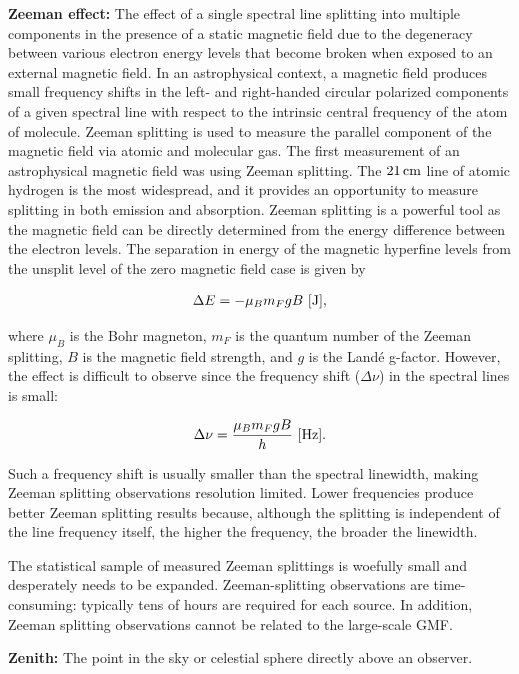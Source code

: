 \documentclass[a4paper,10pt]{article}
\begin{document}
{\noindent}\textbf{Zeeman effect:} The effect of a single spectral line splitting into multiple components in the presence of a static magnetic field due to the degeneracy between various electron energy levels that become broken when exposed to an external magnetic field. In an astrophysical context, a magnetic field produces small frequency shifts in the left- and right-handed circular polarized components of a given spectral line with respect to the intrinsic central frequency of the atom of molecule. Zeeman splitting is used to measure the parallel component of the magnetic field via atomic and molecular gas. The first measurement of an astrophysical magnetic field was using Zeeman splitting. The $21\,{\rm cm}$ line of atomic hydrogen is the most widespread, and it provides an opportunity to measure splitting in both emission and absorption. Zeeman splitting is a powerful tool as the magnetic field can be directly determined from the energy difference between the electron levels. The separation in energy of the magnetic hyperfine levels from the unsplit level of the zero magnetic field case is given by

\begin{align*}
    \Delta E = -\mu_Bm_FgB ~ [{\rm J}],
\end{align*}

{\noindent}where $\mu_B$ is the Bohr magneton, $m_F$ is the quantum number of the Zeeman splitting, $B$ is the magnetic field strength, and $g$ is the Land\'e g-factor. However, the effect is difficult to observe since the frequency shift ($\Delta\nu$) in the spectral lines is small:

\begin{align*}
    \Delta\nu = \frac{\mu_Bm_FgB}{h} ~ [{\rm Hz}].
\end{align*}

{\noindent}Such a frequency shift is usually smaller than the spectral linewidth, making Zeeman splitting observations resolution limited. Lower frequencies produce better Zeeman splitting results because, although the splitting is independent of the line frequency itself, the higher the frequency, the broader the linewidth.

{\noindent}The statistical sample of measured Zeeman splittings is woefully small and desperately needs to be expanded. Zeeman-splitting observations are time-consuming: typically tens of hours are required for each source. In addition, Zeeman splitting observations cannot be related to the large-scale GMF.

{\noindent}\textbf{Zenith:} The point in the sky or celestial sphere directly above an observer.
\end{document}
